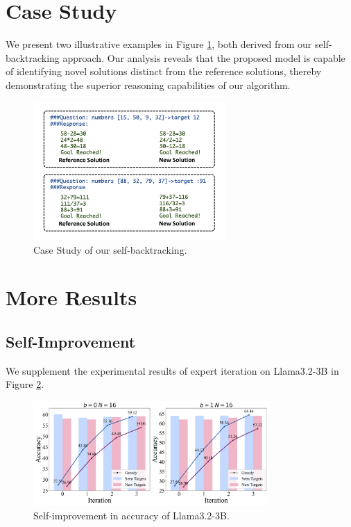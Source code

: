 \documentclass{article}
\theoremstyle{plain}
\theoremstyle{definition}
\theoremstyle{remark}
\begin{document}
\section{Case Study}
We present two illustrative examples in Figure \ref{fig:case}, both derived from our self-backtracking approach. Our analysis reveals that the proposed model is capable of identifying novel solutions distinct from the reference solutions, thereby demonstrating the superior reasoning capabilities of our algorithm.
\begin{figure}[htbp]
    \centering
\includegraphics[width=0.65\textwidth]{fig/appendix_data.pdf}
    \caption{Case Study of our self-backtracking.}
    \label{fig:case}
\end{figure}

\label{app:case}
\section{More Results}
\subsection{Self-Improvement}
\label{app:im}
We supplement the experimental results of expert iteration on Llama3.2-3B in Figure \ref{fig:improvement2}.
\begin{figure}[htbp]
    \centering
\includegraphics[width=0.80\textwidth]{fig/improvement_comparison2.png}
    \caption{Self-improvement in accuracy of Llama3.2-3B.}
    \label{fig:improvement2}
\end{figure}
\end{document}
